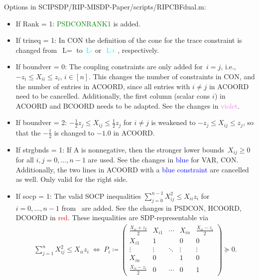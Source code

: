 \documentclass[11pt,a4paper]{article}
\newcommand{\define}{\coloneqq}
\theoremstyle{definition}
\begin{document}
Options in \textsf{SCIPSDP/RIP-MISDP-Paper/scripts/RIPCBFdual.m}:
\begin{itemize}
\item If Rank = 1: \textcolor{green}{PSDCONRANK1} is added.
\item If trineq = 1: In CON the definition of the cone for the trace
  constraint is changed from~$\text{L}=$ to~\textcolor{cyan}{$\text{L-}$}
  or~\textcolor{cyan}{$\text{L}+$}, respectively.
\item If boundver = 0: The coupling constraints are only added for~$i = j$,
  i.e., {\color{violet} $-z_i \leq X_{ii} \leq z_i$, $i \in [n]$}. This
  changes the number of constraints in CON, and the number of entries in
  ACOORD, since all entries with $i \neq j$ in ACOORD need to be
  cancelled. Additionally, the first column (scalar cons $i$) in ACOORD and
  BCOORD needs to be adapted. See the changes in
  \textcolor{violet}{violet}.
\item If boundver = 2: {\color{orange}
    $-\tfrac{1}{2}z_j \leq X_{ij} \leq \tfrac{1}{2}z_j$ for $i \neq j$} is
  weakened to {\color{orange}$-z_j \leq X_{ij} \leq z_j$}, so that the
  {\color{orange} $-\tfrac{1}{2}$} is changed to $-1.0$ in ACOORD.
\item If strgbnds = 1: If A is nonnegative, then the stronger lower
  bounds~$X_{ij} \geq 0$ for all $i,j =0,\dots,n-1$ are used. See the
  changes in \textcolor{blue}{blue} for VAR, CON. Additionally, the two
  lines in ACOORD with a \textcolor{blue}{blue constraint} are cancelled
  as well. Only valid for the right side.
\item If socp = 1: The valid SOCP inequalities
  $\sum_{j=0}^{n-1}X_{ij}^2 \leq X_{ii}z_i$ for $i = 0,\dots,n-1$
  from~\cite{LiX20} are added. See the changes in PSDCON, HCOORD, DCOORD in
  \textcolor{red}{red}. These inequalities are SDP-representable via
  \begin{align*}
    \sum_{j=1}^n X_{ij}^2 \leq X_{ii}z_i \; \Leftrightarrow \;
    P_i \define \begin{pmatrix}
      \tfrac{X_{ii}+z_I}{2} & X_{i1} & \cdots & X_{in} & \tfrac{X_{ii}-z_i}{2}
      \\
      X_{i1} & 1 & & 0 & 0 \\
      \vdots &\vdots & \ddots & \vdots & \vdots \\
      X_{in} & 0 & & 1 & 0 \\
      \tfrac{X_{ii}-z_i}{2} & 0 & \cdots & 0 & 1
    \end{pmatrix} \succeq 0.
  \end{align*}

\end{itemize}
\end{document}
